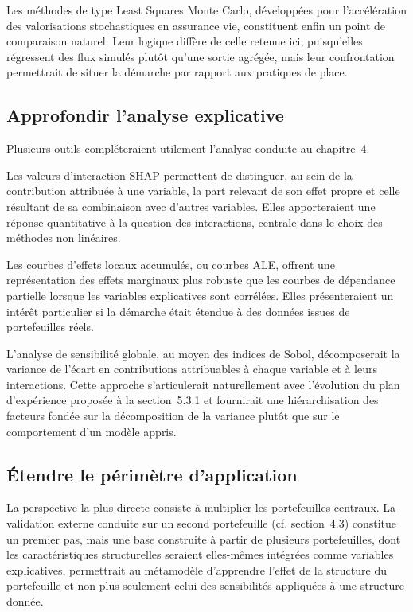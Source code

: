 Les méthodes de type Least Squares Monte Carlo, développées pour l'accélération des valorisations stochastiques en assurance vie, constituent enfin un point de comparaison naturel. Leur logique diffère de celle retenue ici, puisqu'elles régressent des flux simulés plutôt qu'une sortie agrégée, mais leur confrontation permettrait de situer la démarche par rapport aux pratiques de place.

\subsection{Approfondir l'analyse explicative}

Plusieurs outils compléteraient utilement l'analyse conduite au chapitre~4.

Les valeurs d'interaction SHAP permettent de distinguer, au sein de la contribution attribuée à une variable, la part relevant de son effet propre et celle résultant de sa combinaison avec d'autres variables. Elles apporteraient une réponse quantitative à la question des interactions, centrale dans le choix des méthodes non linéaires.

Les courbes d'effets locaux accumulés, ou courbes ALE, offrent une représentation des effets marginaux plus robuste que les courbes de dépendance partielle lorsque les variables explicatives sont corrélées. Elles présenteraient un intérêt particulier si la démarche était étendue à des données issues de portefeuilles réels.

L'analyse de sensibilité globale, au moyen des indices de Sobol, décomposerait la variance de l'écart en contributions attribuables à chaque variable et à leurs interactions. Cette approche s'articulerait naturellement avec l'évolution du plan d'expérience proposée à la section~5.3.1 et fournirait une hiérarchisation des facteurs fondée sur la décomposition de la variance plutôt que sur le comportement d'un modèle appris.

\subsection{Étendre le périmètre d'application}

La perspective la plus directe consiste à multiplier les portefeuilles centraux. La validation externe conduite sur un second portefeuille (cf. section~4.3) constitue un premier pas, mais une base construite à partir de plusieurs portefeuilles, dont les caractéristiques structurelles seraient elles-mêmes intégrées comme variables explicatives, permettrait au métamodèle d'apprendre l'effet de la structure du portefeuille et non plus seulement celui des sensibilités appliquées à une structure donnée.

